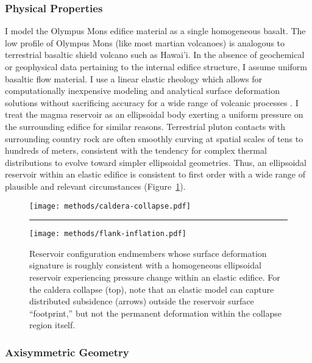 \subsubsection{Physical Properties}

I model the Olympus Mons edifice material as a single homogeneous basalt. The low profile of Olympus Mons (like most martian volcanoes) is analogous to terrestrial basaltic shield volcano such as Hawai'i. In the absence of geochemical or geophysical data pertaining to the internal edifice structure, I assume uniform basaltic flow material. I use a linear elastic rheology which allows for computationally inexpensive modeling and analytical surface deformation solutions \parencite{mogi_relations_1958} without sacrificing accuracy for a wide range of volcanic processes \parencite{grosfils_elastic_2015}. I treat the magma reservoir as an ellipsoidal body exerting a uniform pressure on the surrounding edifice for similar reasons. Terrestrial pluton contacts with surrounding country rock are often smoothly curving at spatial scales of tens to hundreds of meters, consistent with the tendency for complex thermal distributions to evolve toward simpler ellipsoidal geometries. Thus, an ellipsoidal reservoir within an elastic edifice is consistent to first order with a wide range of plausible and relevant circumstances (Figure~\ref{fig:reservoir-configs}).

\begin{figure}
    \texttt{[image: methods/caldera-collapse.pdf]}\\
    \vspace{1cm}
    \hrule
    \vspace{1cm}
    \texttt{[image: methods/flank-inflation.pdf]}
    \caption[Ellipsoidal reservoir configurations]{Reservoir configuration endmembers whose surface deformation signature is roughly consistent with a homogeneous ellipsoidal reservoir experiencing pressure change within an elastic edifice. For the caldera collapse (top), note that an elastic model can capture distributed subsidence (arrows) outside the reservoir surface ``footprint,'' but not the permanent deformation within the collapse region itself.}
    \label{fig:reservoir-configs}
\end{figure}

\subsubsection{Axisymmetric Geometry}

